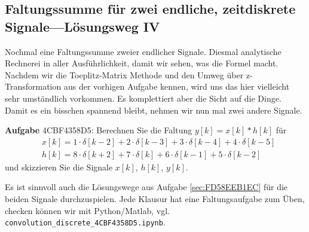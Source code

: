 \newpage
\subsection{Faltungssumme für zwei endliche, zeitdiskrete Signale---Lösungsweg IV}
\label{sec:4CBF4358D5}
\begin{Ziel}
Nochmal eine Faltungssumme zweier endlicher Signale. Diesmal analytische
Rechnerei in aller Ausführlichkeit, damit wir sehen, was die Formel macht.
Nachdem wir die Toeplitz-Matrix Methode und den Umweg über z-Transformation
aus der vorhigen Aufgabe kennen, wird
uns das hier vielleicht sehr umständlich vorkommen. Es komplettiert aber die
Sicht auf die Dinge.
Damit es ein bisschen spannend bleibt, nehmen wir nun mal zwei andere Signale.
\end{Ziel}
\textbf{Aufgabe} {\tiny 4CBF4358D5}: Berechnen Sie die Faltung $y[k] = x[k] * h[k]$
für
\begin{align}
&x[k] = 1\cdot\delta[k-2] + 2\cdot\delta[k-3] + 3\cdot\delta[k-4] + 4\cdot\delta[k-5]\\
&h[k] = 8\cdot\delta[k+2] + 7\cdot\delta[k]   + 6\cdot\delta[k-1] + 5\cdot\delta[k-2]
\end{align}
und skizzieren Sie die Signale $x[k]$, $h[k]$, $y[k]$.

Es ist sinnvoll auch die Lösungswege aus Aufgabe \ref{sec:FD58EEB1EC}
für die beiden Signale durchzuspielen. Jede Klausur hat eine Faltungsaufgabe
zum Üben, checken können wir mit Python/Matlab, vgl. \texttt{convolution\_discrete\_4CBF4358D5.ipynb}.

